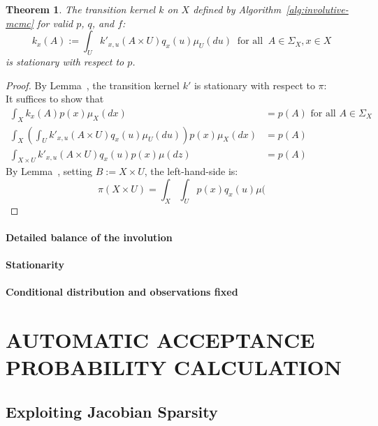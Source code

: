 \documentclass[twoside]{article}
\newtheorem{theorem}{Theorem}[section]
\begin{document}
\begin{theorem}\label{theorem:stationarity}
The transition kernel $k$ on $X$ defined by Algorithm~\ref{alg:involutive-mcmc} for valid $p$, $q$, and $f$:
\[
k_x(A) := \int_U k'_{x,u}(A \times U) q_x(u) \mu_U(du) \;\; \mbox{for all} \;\; A \in \Sigma_X, x \in X
\]
is stationary with respect to $p$.
\end{theorem}
\begin{proof}
By Lemma~\citep{lemma:involution-detailed-balance}, the transition kernel $k'$ is stationary with respect to $\pi$:
\[
\]
It suffices to show that
\begin{align*}
\int_X k_x(A) p(x) \mu_X(dx) &= p(A) \mbox{ for all } A \in \Sigma_X\\
\int_X \left( \int_U k'_{x,u}(A \times U) q_x(u) \mu_U(du) \right) p(x) \mu_X(dx) &= p(A)\\
\int_{X \times U} k'_{x,u}(A \times U) q_x(u) p(x) \mu(dz) &= p(A)
\end{align*}
By Lemma~\citep{lemma:involution-detailed-balance}, setting $B := X \times U$, the left-hand-side is:
\[
\pi(X \times U) = \int_X \int_U p(x) q_x(u) \mu(
\]
\end{proof}
\paragraph{Detailed balance of the involution}

\paragraph{Stationarity}

\paragraph{Conditional distribution and observations fixed}


\section{AUTOMATIC ACCEPTANCE PROBABILITY CALCULATION}

\subsection{Exploiting Jacobian Sparsity}
\end{document}
